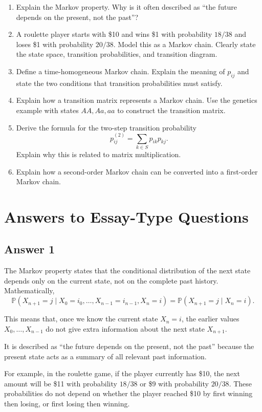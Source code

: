 \documentclass[12pt,a4paper]{article}
\theoremstyle{lecturestyle}
\newcommand{\Prob}{\mathbb{P}}
\begin{document}
\begin{enumerate}[label=\textbf{Q\arabic*.}, leftmargin=1.2cm]
    \item Explain the Markov property. Why is it often described as ``the future depends on the present, not the past''?
    \item A roulette player starts with \$10 and wins \$1 with probability $18/38$ and loses \$1 with probability $20/38$. Model this as a Markov chain. Clearly state the state space, transition probabilities, and transition diagram.
    \item Define a time-homogeneous Markov chain. Explain the meaning of $p_{ij}$ and state the two conditions that transition probabilities must satisfy.
    \item Explain how a transition matrix represents a Markov chain. Use the genetics example with states $AA,Aa,aa$ to construct the transition matrix.
    \item Derive the formula for the two-step transition probability
    \[
    p_{ij}^{(2)}=\sum_{k\in S}p_{ik}p_{kj}.
    \]
    Explain why this is related to matrix multiplication.
    \item Explain how a second-order Markov chain can be converted into a first-order Markov chain.
\end{enumerate}

\section{Answers to Essay-Type Questions}

\subsection*{Answer 1}

The Markov property states that the conditional distribution of the next state depends only on the current state, not on the complete past history. Mathematically,
\[
\Prob(X_{n+1}=j\mid X_0=i_0,\ldots,X_{n-1}=i_{n-1},X_n=i)
=
\Prob(X_{n+1}=j\mid X_n=i).
\]

This means that, once we know the current state $X_n=i$, the earlier values $X_0,\ldots,X_{n-1}$ do not give extra information about the next state $X_{n+1}$.

It is described as ``the future depends on the present, not the past'' because the present state acts as a summary of all relevant past information.

For example, in the roulette game, if the player currently has \$10, the next amount will be \$11 with probability $18/38$ or \$9 with probability $20/38$. These probabilities do not depend on whether the player reached \$10 by first winning then losing, or first losing then winning.
\end{document}
